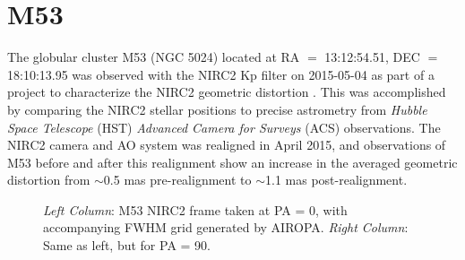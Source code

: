 \documentclass[]{spie}  %
\begin{document}

\section{M53} \label{sec:m53-data}
The globular cluster M53 (NGC 5024) located at RA $=$ 13:12:54.51, DEC $=$ 18:10:13.95 was observed with the NIRC2 Kp filter on 2015-05-04 as part of a project to characterize the NIRC2 geometric distortion \cite{service:2016a}. This was accomplished by comparing the NIRC2 stellar positions to precise astrometry from \textit{Hubble Space Telescope} (HST) \textit{Advanced Camera for Surveys} (ACS) observations. The NIRC2 camera and AO system was realigned in April 2015, and observations of M53 before and after this realignment show an increase in the averaged geometric distortion from $\sim$0.5 mas pre-realignment to $\sim$1.1 mas post-realignment.

\begin{figure}[!htb]
 \caption{\footnotesize \textit{Left Column}: M53 NIRC2 frame taken at PA = 0, with accompanying FWHM grid generated by AIROPA. \textit{Right Column}: Same as left, but for PA = 90.} \label{fig:m53_image_grid}
\end{figure}
\end{document}

